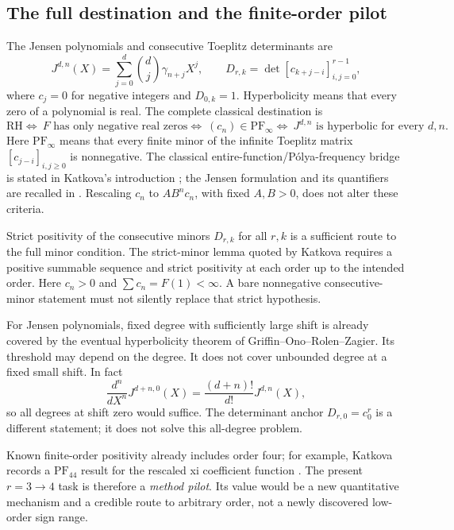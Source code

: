 \documentclass[11pt,letterpaper]{article}
\numberwithin{equation}{section}
\theoremstyle{remark}
\begin{document}
\subsection{The full destination and the finite-order pilot}

The Jensen polynomials and consecutive Toeplitz determinants are
\begin{equation}
 J^{d,n}(X)=\sum_{j=0}^d\binom dj\gamma_{n+j}X^j,
 \qquad D_{r,k}=\det[c_{k+j-i}]_{i,j=0}^{r-1}, \label{eq:targets}
\end{equation}
where $c_j=0$ for negative integers and $D_{0,k}=1$.
Hyperbolicity means that every zero of a polynomial is real.
The complete classical destination is
\begin{equation}
 \mathrm{RH} \Longleftrightarrow\ F\text{ has only negative real zeros}
 \Longleftrightarrow\ (c_n)\in\mathrm{PF}_{\infty}
 \Longleftrightarrow\ J^{d,n}\text{ is hyperbolic for every }d,n.
 \label{eq:rh}
\end{equation}
Here $\mathrm{PF}_{\infty}$ means that every finite minor of the
infinite Toeplitz matrix $[c_{j-i}]_{i,j\ge0}$ is nonnegative.
The classical entire-function/P\'olya-frequency bridge is stated in
Katkova's introduction \cite{Katkova0505174v1}; the Jensen formulation
and its quantifiers are recalled in \cite{GriffinOnoRolenZagier2019Jensen}.
Rescaling $c_n$ to $A B^n c_n$, with fixed $A,B>0$, does not alter
these criteria.

Strict positivity of the consecutive minors $D_{r,k}$ for all $r,k$ is
a sufficient route to the full minor condition. The strict-minor lemma
quoted by Katkova requires a positive summable sequence and strict
positivity at each order up to the intended order. Here $c_n>0$ and
$\sum c_n=F(1)<\infty$. A bare nonnegative consecutive-minor statement
must not silently replace that strict hypothesis.

For Jensen polynomials, fixed degree with sufficiently large shift is
already covered by the eventual hyperbolicity theorem of
Griffin--Ono--Rolen--Zagier. Its threshold may depend on the degree.
It does not cover unbounded degree at a fixed small shift. In fact
\begin{equation}
 \frac{d^n}{dX^n}J^{d+n,0}(X)=\frac{(d+n)!}{d!}J^{d,n}(X),
\end{equation}
so all degrees at shift zero would suffice. The determinant anchor
$D_{r,0}=c_0^r$ is a different statement; it does not solve this
all-degree problem.

Known finite-order positivity already includes order four; for example,
Katkova records a $\mathrm{PF}_{44}$ result for the rescaled xi
coefficient function \cite[Theorem 1]{Katkova0505174v1}. The present
$r=3\to4$ task is therefore a \emph{method pilot}. Its value would be a
new quantitative mechanism and a credible route to arbitrary order,
not a newly discovered low-order sign range.
\end{document}

